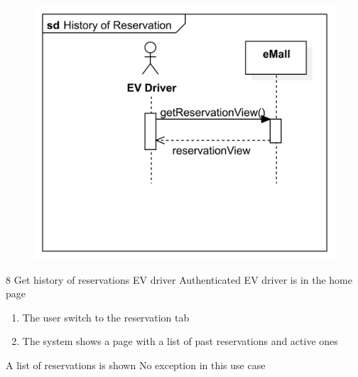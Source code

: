 \usecase
{
    \begin{figure}[H]
        \centering
        \includegraphics[scale=0.9]{src/sequence_diagram/reservationView.png}
    \end{figure}
}
{8}
{Get history of reservations}
{EV driver}
{Authenticated EV driver is in the home page}
{
    \begin{enumerate}
        \item The user switch to the reservation tab
        \item The system shows a page with a list of past reservations and active ones
    \end{enumerate}
}
{A list of reservations is shown}
{
    No exception in this use case
}
{
}

